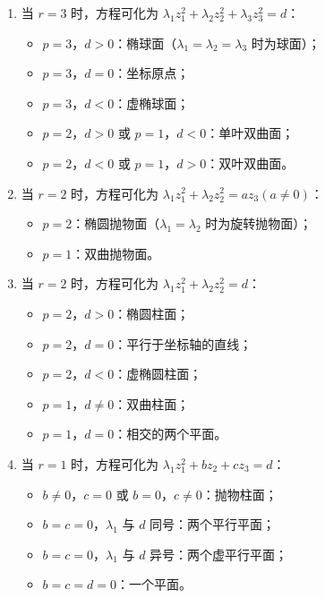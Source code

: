 \documentclass[UTF8]{ctexart}
\theoremstyle{remark}
\begin{document}
\begin{enumerate}
\begin{enumerate}
	\item 当 \(r = 3\) 时，方程可化为 \(\lambda_1 z_1^2 + \lambda_2 z_2^2 + \lambda_3 z_3^2 = d\)：
	\begin{itemize}
		\item \(p = 3\)，\(d > 0\)：椭球面（\(\lambda_1 = \lambda_2 = \lambda_3\) 时为球面）；
		\item \(p = 3\)，\(d = 0\)：坐标原点；
		\item \(p = 3\)，\(d < 0\)：虚椭球面；
		\item \(p = 2\)，\(d > 0\) 或 \(p = 1\)，\(d < 0\)：单叶双曲面；
		\item \(p = 2\)，\(d < 0\) 或 \(p = 1\)，\(d > 0\)：双叶双曲面。
	\end{itemize}
	\item 当 \(r = 2\) 时，方程可化为 \(\lambda_1 z_1^2 + \lambda_2 z_2^2 = a z_3 (a \neq 0)\)：
	\begin{itemize}
		\item \(p = 2\)：椭圆抛物面（\(\lambda_1 = \lambda_2\) 时为旋转抛物面）；
		\item \(p = 1\)：双曲抛物面。
	\end{itemize}
	\item 当 \(r = 2\) 时，方程可化为 \(\lambda_1 z_1^2 + \lambda_2 z_2^2 = d\)：
	\begin{itemize}
		\item \(p = 2\)，\(d > 0\)：椭圆柱面；
		\item \(p = 2\)，\(d = 0\)：平行于坐标轴的直线；
		\item \(p = 2\)，\(d < 0\)：虚椭圆柱面；
		\item \(p = 1\)，\(d \neq 0\)：双曲柱面；
		\item \(p = 1\)，\(d = 0\)：相交的两个平面。
	\end{itemize}
	\item 当 \(r = 1\) 时，方程可化为 \(\lambda_1 z_1^2 + b z_2 + c z_3 = d\)：
	\begin{itemize}
		\item \(b \neq 0\)，\(c = 0\) 或 \(b = 0\)，\(c \neq 0\)：抛物柱面；
		\item \(b = c = 0\)，\(\lambda_1\) 与 \(d\) 同号：两个平行平面；
		\item \(b = c = 0\)，\(\lambda_1\) 与 \(d\) 异号：两个虚平行平面；
		\item \(b = c = d = 0\)：一个平面。
	\end{itemize}
\end{enumerate}
\end{enumerate}
\end{document}
